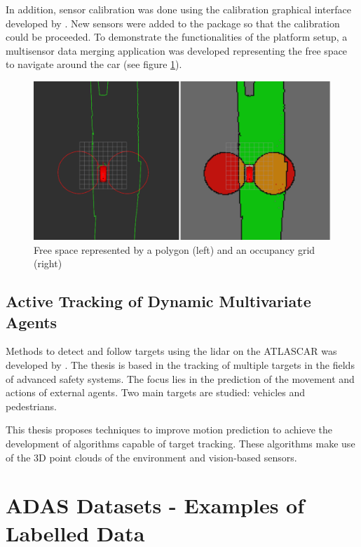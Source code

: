 In addition, sensor calibration was done using the calibration graphical interface developed by \cite{VieiradaSilva2016}. New sensors were added to the package so that the calibration could be proceeded. To demonstrate the functionalities of the platform setup, a multisensor data merging application was developed representing the free space to navigate around the car (see figure \ref{fig:diogo}).

\begin{figure}[htp]
	
	\centering
	\includegraphics[width=1\textwidth]{capstate/imgs/diogo.png}
	
	\caption{Free space represented by a polygon (left) and an occupancy grid (right)}
	\label{fig:diogo}
	
\end{figure}

\subsection{Active Tracking of Dynamic Multivariate Agents} 

Methods to detect and follow targets using the \gls{lidar} on the ATLASCAR was developed by  \cite{SoaresDeAlmeida2016a}. The thesis is based in the tracking of multiple targets in the fields of advanced safety systems. The focus lies in the prediction of the movement and actions of external agents. Two main targets are studied: vehicles and pedestrians. 

This thesis proposes techniques to improve motion prediction to achieve the development of algorithms capable of target tracking. These algorithms make use of the 3D point clouds of the environment and vision-based sensors. 

\section{ADAS Datasets - Examples of Labelled Data}

